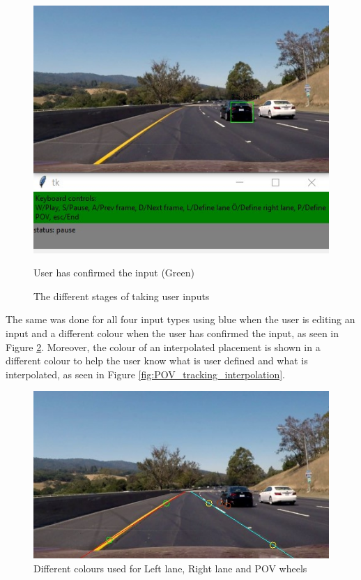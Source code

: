 \begin{figure}[H]
\vspace{5mm}\\
\begin{minipage}[b]{0.45\linewidth}
    \includegraphics[width=\textwidth]{Figures/define_vehicle_3.jpg}
    \caption*{User has confirmed the input (Green)}
\end{minipage}
\caption{The different stages of taking user inputs}
\label{fig:stages_of_inputs}
\end{figure}

The same was done for all four input types using blue when the user is editing an input and a different colour when the user has confirmed the input, as seen in 
Figure \ref{fig:define_all}. Moreover, the colour of an interpolated placement is shown in a different colour to help the user know what is user defined and what is interpolated, as seen in Figure \ref{fig:POV_tracking_interpolation}. 

\begin{figure}[H]
    \centering
    \includegraphics[width=\textwidth]{Figures/define_all.jpg}
    \caption{Different colours used for Left lane, Right lane and POV wheels}
    \label{fig:define_all}
\end{figure}


